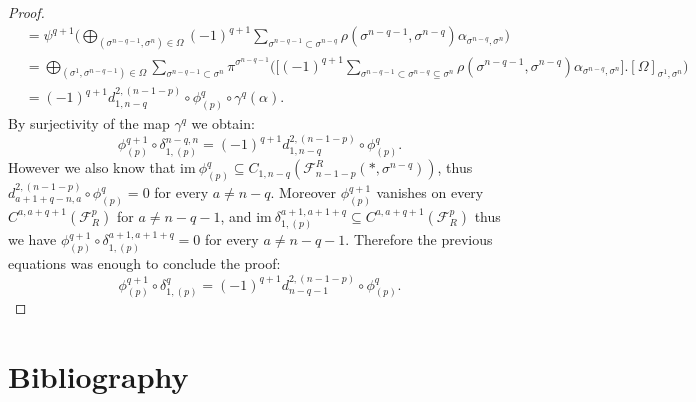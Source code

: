 \documentclass{article}
\begin{document}
\begin{proof}
\begin{align*}
        & = \psi^{q+1} \Bigg( \bigoplus_{(\sigma^{n-q-1},\sigma^n)\in\Omega} (-1)^{q+1}\sum_{\sigma^{n-q-1} \subset \sigma^{n-q}}\rho(\sigma^{n-q-1},\sigma^{n-q})\alpha_{\sigma^{n-q},\sigma^n}\Bigg) \\
        &= \bigoplus_{(\sigma^1,\sigma^{n-q-1})\in\Omega}\sum_{\sigma^{n-q-1}\subset \sigma^{n}}\pi^{\sigma^{n-q-1}}\Bigg( \Bigg[(-1)^{q+1}\sum_{\sigma^{n-q-1}\subset \sigma^{n-q}\subseteq \sigma^n} \rho(\sigma^{n-q-1},\sigma^{n-q})\alpha_{\sigma^{n-q},\sigma^n}\Bigg].[\Omega]_{\sigma^1,\sigma^n}\Bigg) \\
        &=(-1)^{q+1}d^{2,(n-1-p)}_{1,n-q} \circ \phi^q_{(p)} \circ \gamma^q(\alpha).
    \end{align*}
    By surjectivity of the map $\gamma^q$ we obtain:
    \begin{equation*}
        \phi^{q+1}_{(p)}\circ \delta^{n-q,n}_{1,(p)} = (-1)^{q+1}d^{2,(n-1-p)}_{1,n-q} \circ \phi^q_{(p)}.
    \end{equation*}
    However we also know that $\mathrm{im} ~ \phi^q_{(p)} \subseteq C_{1,n-q}(\mathcal{F}_{n-1-p}^R(*,\sigma^{n-q}))$, thus $d^{2,(n-1-p)}_{a+1+q-n,a} \circ \phi^q_{(p)} = 0$ for every $a\neq n-q$. Moreover $\phi^{q+1}_{(p)}$ vanishes on every $C^{a,a+q+1}(\mathcal{F}^p_R)$ for $a \neq n-q-1$, and $\mathrm{im}~\delta^{a+1,a+1+q}_{1,(p)} \subseteq C^{a,a+q+1}(\mathcal{F}^p_R)$ thus we have $\phi^{q+1}_{(p)}\circ\delta^{a+1,a+1+q}_{1,(p)} =0$ for every $a \neq n-q-1$. Therefore the previous equations was enough to conclude the proof:
    \begin{equation*}
        \phi^{q+1}_{(p)} \circ \delta_{1,(p)}^q = (-1)^{q+1} d^{2,(n-1-p)}_{n-q-1} \circ \phi^q_{(p)}.
    \end{equation*}
\end{proof}

\section{Bibliography}
\end{document}
